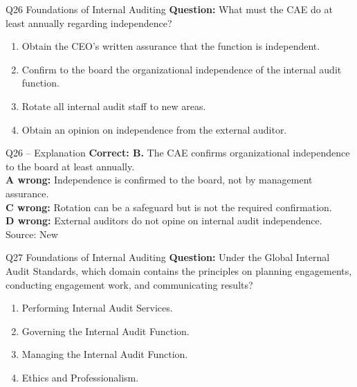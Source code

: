 \documentclass[aspectratio=169,10pt]{beamer}
\begin{document}
\begin{frame}[t]{Q26 \hfill {\scriptsize Foundations of Internal Auditing}}
	\small
	\textbf{Question:} What must the CAE do at least annually regarding independence?
	\begin{enumerate}[label=\Alph*.,itemsep=1pt,topsep=3pt]
			\item Obtain the CEO's written assurance that the function is independent.
			\item Confirm to the board the organizational independence of the internal audit function.
			\item Rotate all internal audit staff to new areas.
			\item Obtain an opinion on independence from the external auditor.
	\end{enumerate}
\end{frame}

\begin{frame}[t]{Q26 -- Explanation}
	\footnotesize
	\textbf{Correct: B.} The CAE confirms organizational independence to the board at least annually. \\[5pt]
\textbf{A wrong:} Independence is confirmed to the board, not by management assurance. \\[3pt]
\textbf{C wrong:} Rotation can be a safeguard but is not the required confirmation. \\[3pt]
\textbf{D wrong:} External auditors do not opine on internal audit independence. \\[3pt]
	\vfill {\tiny Source: New}
\end{frame}

\begin{frame}[t]{Q27 \hfill {\scriptsize Foundations of Internal Auditing}}
	\small
	\textbf{Question:} Under the Global Internal Audit Standards, which domain contains the principles on planning engagements, conducting engagement work, and communicating results?
	\begin{enumerate}[label=\Alph*.,itemsep=1pt,topsep=3pt]
			\item Performing Internal Audit Services.
			\item Governing the Internal Audit Function.
			\item Managing the Internal Audit Function.
			\item Ethics and Professionalism.
	\end{enumerate}
\end{frame}
\end{document}

